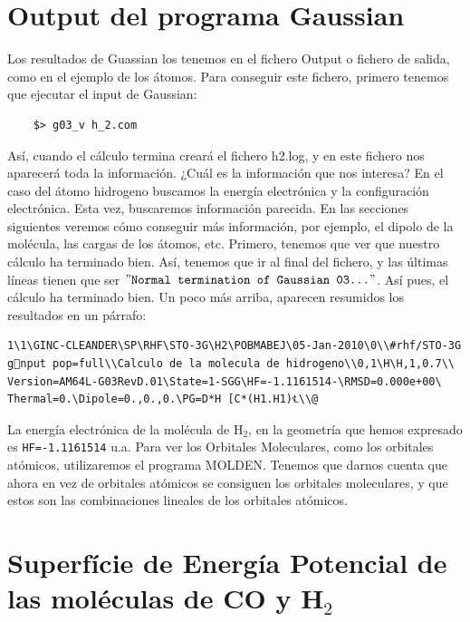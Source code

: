 \documentclass{tufte-book}
\begin{document}
\section{Output del programa Gaussian}

Los resultados de Guassian los tenemos en el fichero Output o fichero de salida, como en el ejemplo de los átomos. Para conseguir este fichero, primero tenemos que ejecutar el input de Gaussian:

\begin{verbatim}
    $> g03_v h_2.com
\end{verbatim}

Así, cuando el cálculo termina creará el fichero h2.log, y en este fichero nos aparecerá toda la información. ¿Cuál es la información que nos interesa? En el caso del átomo hidrogeno buscamos la energía electrónica y la configuración electrónica. Esta vez, buscaremos información parecida. En las secciones siguientes veremos cómo conseguir más información, por ejemplo, el dipolo de la molécula, las cargas de los átomos, etc. Primero, tenemos que ver que nuestro cálculo ha terminado bien. Así, tenemos que ir al final del fichero, y las últimas líneas tienen que ser $"\texttt{Normal termination of Gaussian 03...}"$. Así pues, el cálculo ha terminado bien. Un poco más arriba, aparecen resumidos los resultados en un párrafo:

\begin{verbatim}
1\1\GINC-CLEANDER\SP\RHF\STO-3G\H2\POBMABEJ\05-Jan-2010\0\\#rhf/STO-3G
gnput pop=full\\Calculo de la molecula de hidrogeno\\0,1\H\H,1,0.7\\
Version=AM64L-G03RevD.01\State=1-SGG\HF=-1.1161514-\RMSD=0.000e+00\
Thermal=0.\Dipole=0.,0.,0.\PG=D*H [C*(H1.H1)℄\\@
\end{verbatim}

La energía electrónica de la molécula de H$_2$, en la geometría que hemos expresado es \texttt{HF=-1.1161514} u.a. Para ver los Orbitales Moleculares, como los orbitales atómicos, utilizaremos el programa MOLDEN. Tenemos que darnos cuenta que ahora en vez de orbitales atómicos se consiguen los orbitales moleculares, y que estos son las combinaciones lineales de los orbitales atómicos.

\section{Superfície de Energía Potencial de las moléculas de CO y H$_2$}
\end{document}
